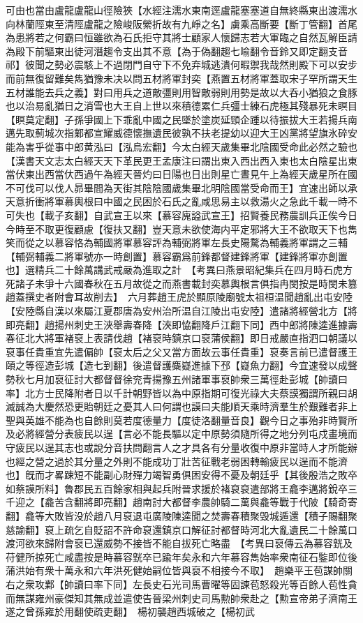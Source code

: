 可由也當由盧龍盧龍山徑險狹【水經注濡水東南逕盧龍塞塞道自無終縣東出渡濡水向林蘭陘東至清陘盧龍之險峻阪縈折故有九崢之名】虜乘高斷要【斷丁管翻】首尾為患將若之何霸曰恒雖欲為石氏拒守其將士顧家人懷歸志若大軍臨之自然瓦解臣請為殿下前驅東出徒河潛趨令支出其不意【為于偽翻趨七喻翻令音鈴又即定翻支音祁】彼聞之勢必震駭上不過閉門自守下不免弃城逃潰何暇禦我哉然則殿下可以安步而前無復留難矣雋猶豫未决以問五材將軍封奕【燕置五材將軍蓋取宋子罕所謂天生五材誰能去兵之義】對曰用兵之道敵彊則用智敵弱則用勢是故以大呑小猶狼之食豚也以治易亂猶日之消雪也大王自上世以來積德累仁兵彊士練石虎極其殘暴死未瞑目【瞑莫定翻】子孫爭國上下乖亂中國之民墜於塗炭延頸企踵以待振拔大王若揚兵南邁先取薊城次指鄴都宣耀威德懷撫遺民彼孰不扶老提幼以迎大王凶黨將望旗氷碎安能為害乎從事中郎黄泓曰【泓烏宏翻】今太白經天歲集畢北陰國受命此必然之驗也【漢書天文志太白經天天下革民更王孟康注曰謂出東入西出西入東也太白陰星出東當伏東出西當㐲西過午為經天晉灼曰日陽也日出則星亡晝見午上為經天歲星所在國不可伐可以伐人昴畢間為天街其陰陰國歲集畢北明陰國當受命而王】宜速出師以承天意折衝將軍慕輿根曰中國之民困於石氏之亂咸思易主以救湯火之急此千載一時不可失也【載子亥翻】自武宣王以來【慕容廆謚武宣王】招賢養民務農訓兵正俟今日今時至不取更復顧慮【復扶又翻】豈天意未欲使海内平定邪將大王不欲取天下也雋笑而從之以慕容恪為輔國將軍慕容評為輔弼將軍左長史陽騖為輔義將軍謂之三輔【輔弼輔義二將軍號亦一時創置】慕容霸爲前鋒都督建鋒將軍【建鋒將軍亦創置也】選精兵二十餘萬講武戒嚴為進取之計　【考異曰燕景昭紀集兵在四月時石虎方死諸子未爭十六國春秋在五月故從之而燕書載封奕慕輿根言俱指冉閔按是時閔未篡趙蓋撰史者附會耳故削去】　六月葬趙王虎於顯原陵廟號太祖桓温聞趙亂出屯安陸【安陸縣自漢以來屬江夏郡唐為安州治所温自江陵出屯安陸】遣諸將經營北方【將即亮翻】趙揚州刺史王浹舉壽春降【浹即恊翻降戶江翻下同】西中郎將陳逵進據壽春征北大將軍褚裒上表請伐趙【褚裒時鎮京口裒蒲侯翻】即日戒嚴直指泗口朝議以裒事任貴重宜先遣偏帥【裒太后之父又當方面故云事任貴重】裒奏言前已遣督護王頤之等徑造彭城【造七到翻】後遣督護麋嶷進據下邳【嶷魚力翻】今宜速發以成聲勢秋七月加裒征討大都督督徐兖青揚豫五州諸軍事裒帥衆三萬徑赴彭城【帥讀曰率】北方士民降附者日以千計朝野皆以為中原指期可復光祿大夫蔡謨獨謂所親曰胡滅誠為大慶然恐更貽朝廷之憂其人曰何謂也謨曰夫能順天乘時濟羣生於艱難者非上聖與英雄不能為也自餘則莫若度德量力【度徒洛翻量音良】觀今日之事殆非時賢所及必將經營分表疲民以逞【言必不能長驅以定中原勢須隨所得之地分列屯戍畫境而守疲民以逞其志也或說分音扶問翻言人之才具各有分量收復中原非當時人才所能辦也經之營之過於其分量之外則不能成功丁壯苦征戰老弱困轉輸疲民以逞而不能濟也】旣而才畧踈短不能副心財殫力竭智勇俱困安得不憂及朝廷乎【其後殷浩之敗卒如蔡謨所料】魯郡民五百餘家相與起兵附晉求援於褚裒裒遣部將王龕李邁將銳卒三千迎之【龕苦含翻將即亮翻】趙南討大都督李農帥騎二萬與龕等戰于代陂【騎奇寄翻】龕等大敗皆没於趙八月裒退屯廣陵陳逵聞之焚壽春積聚毁城遁還【積子賜翻聚慈諭翻】裒上疏乞自貶詔不許命裒還鎮京口解征討都督時河北大亂遺民二十餘萬口渡河欲來歸附會裒已還威勢不接皆不能自拔死亡略盡　【考異曰裒傳云為慕容皝及苻健所掠死亡咸盡按是時慕容皝卒已踰年矣永和六年慕容雋始率衆南征石鍳即位後蒲洪始有衆十萬永和六年洪死健始嗣位皆與裒不相接今不取】　趙樂平王苞謀帥關右之衆攻鄴【帥讀曰率下同】左長史石光司馬曹曜等固諫苞怒殺光等百餘人苞性貪而無謀雍州豪傑知其無成並遣使告晉梁州刺史司馬勲帥衆赴之【勲宣帝弟子濟南王遂之曾孫雍於用翻使疏吏翻】　楊初襲趙西城破之【楊初武